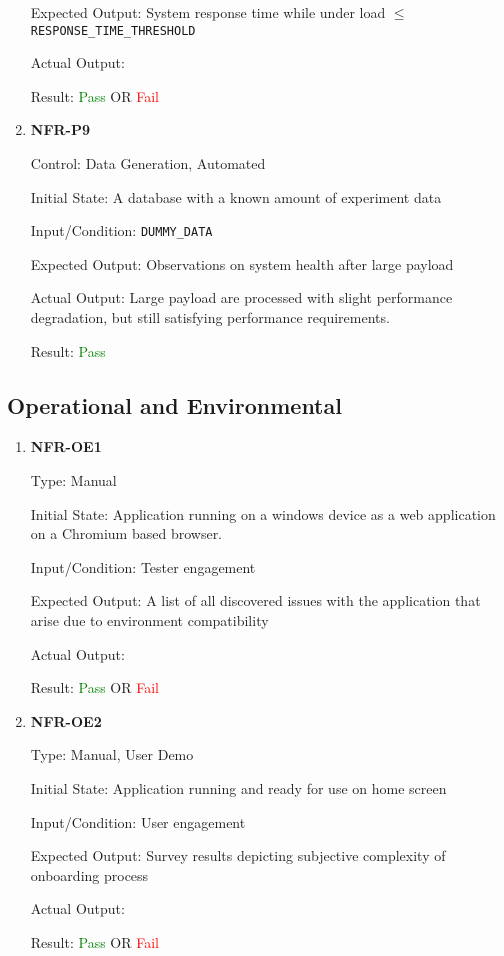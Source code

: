 \documentclass[12pt, titlepage]{article}
\begin{document}
\begin{enumerate}
Expected Output: System response time while under load $\leq$
\texttt{RESPONSE\_TIME\_THRESHOLD}

Actual Output:

Result: \textcolor{green}{Pass} OR \textcolor{red}{Fail}

\item{\textbf{NFR-P9}} \label{NFR:P9}

Control: Data Generation, Automated

Initial State: A database with a known amount of experiment data

Input/Condition: \texttt{DUMMY\_DATA}

Expected Output: Observations on system health after large payload

Actual Output: Large payload are processed with slight performance degradation,
but still satisfying performance requirements.

Result: \textcolor{green}{Pass}

\end{enumerate}

\subsection{Operational and Environmental}
\begin{enumerate}
\item{\textbf{NFR-OE1}} \label{NFR:OE1}

Type: Manual

Initial State: Application running on a windows device as a web application on a
Chromium based browser.

Input/Condition: Tester engagement

Expected Output: A list of all discovered issues with the application that arise
due to environment compatibility

Actual Output:

Result: \textcolor{green}{Pass} OR \textcolor{red}{Fail}
            
\item\textbf{{NFR-OE2}} \label{NFR:OE2}

Type: Manual, User Demo

Initial State: Application running and ready for use on home screen

Input/Condition: User engagement

Expected Output: Survey results depicting subjective complexity of onboarding
process

Actual Output:

Result: \textcolor{green}{Pass} OR \textcolor{red}{Fail}
\end{enumerate}
\end{document}
